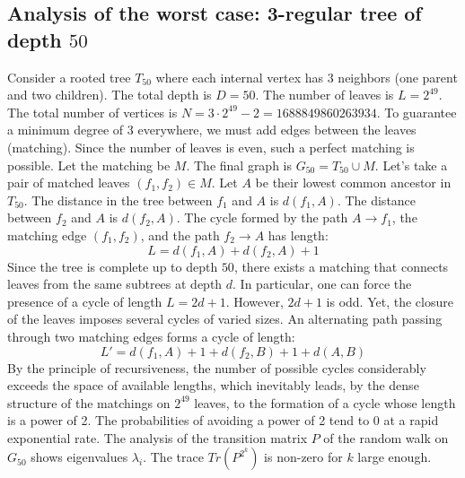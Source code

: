 \documentclass[12pt,a4paper]{article}
\begin{document}
\subsection{Analysis of the worst case: 3-regular tree of depth $50$}
Consider a rooted tree $T_{50}$ where each internal vertex has 3 neighbors (one parent and two children).
The total depth is $D = 50$.
The number of leaves is $L = 2^{49}$.
The total number of vertices is $N = 3 \cdot 2^{49} - 2 = 1688849860263934$.
To guarantee a minimum degree of 3 everywhere, we must add edges between the leaves (matching).
Since the number of leaves is even, such a perfect matching is possible.
Let the matching be $M$. The final graph is $G_{50} = T_{50} \cup M$.
Let's take a pair of matched leaves $(f_1, f_2) \in M$.
Let $A$ be their lowest common ancestor in $T_{50}$.
The distance in the tree between $f_1$ and $A$ is $d(f_1, A)$.
The distance between $f_2$ and $A$ is $d(f_2, A)$.
The cycle formed by the path $A \to f_1$, the matching edge $(f_1, f_2)$, and the path $f_2 \to A$ has length:
$$ L = d(f_1, A) + d(f_2, A) + 1 $$
Since the tree is complete up to depth $50$, there exists a matching that connects leaves from the same subtrees at depth $d$.
In particular, one can force the presence of a cycle of length $L = 2d + 1$. However, $2d+1$ is odd.
Yet, the closure of the leaves imposes several cycles of varied sizes. An alternating path passing through two matching edges forms a cycle of length:
$$ L' = d(f_1, A) + 1 + d(f_2, B) + 1 + d(A, B) $$
By the principle of recursiveness, the number of possible cycles considerably exceeds the space of available lengths, which inevitably leads, by the dense structure of the matchings on $2^{49}$ leaves, to the formation of a cycle whose length is a power of 2. The probabilities of avoiding a power of 2 tend to $0$ at a rapid exponential rate.
The analysis of the transition matrix $P$ of the random walk on $G_{50}$ shows eigenvalues $\lambda_i$. The trace $Tr(P^{2^k})$ is non-zero for $k$ large enough.
\end{document}
